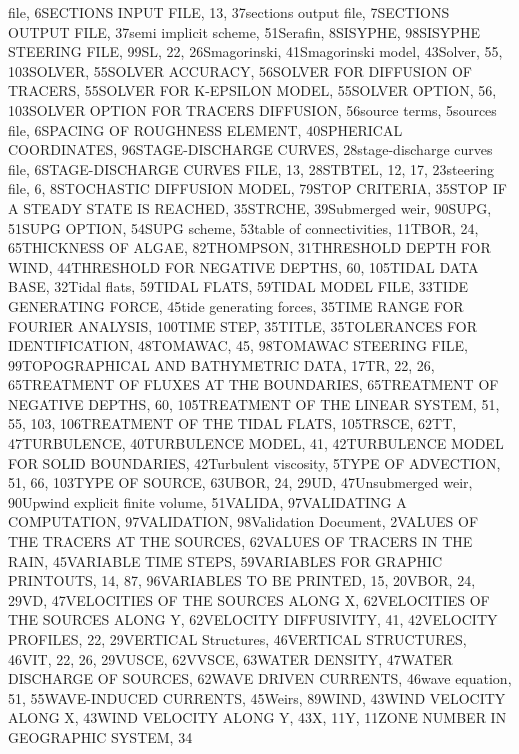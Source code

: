 \documentclass{article} %
\begin{document}
file, 6SECTIONS INPUT FILE, 13, 37sections output file, 7SECTIONS OUTPUT FILE, 37semi implicit scheme, 51Serafin, 8SISYPHE, 98SISYPHE STEERING FILE, 99SL, 22, 26Smagorinski, 41Smagorinski model, 43Solver, 55, 103SOLVER, 55SOLVER ACCURACY, 56SOLVER FOR DIFFUSION OF TRACERS, 55SOLVER FOR K-EPSILON  MODEL, 55SOLVER OPTION, 56, 103SOLVER OPTION FOR TRACERS DIFFUSION, 56source terms, 5sources file, 6SPACING OF ROUGHNESS ELEMENT, 40SPHERICAL COORDINATES, 96STAGE-DISCHARGE CURVES, 28stage-discharge curves file, 6STAGE-DISCHARGE CURVES FILE, 13, 28STBTEL, 12, 17, 23steering file, 6, 8STOCHASTIC DIFFUSION MODEL, 79STOP CRITERIA, 35STOP IF A STEADY STATE IS REACHED, 35STRCHE, 39Submerged weir, 90SUPG, 51SUPG OPTION, 54SUPG scheme, 53table of connectivities, 11TBOR, 24, 65THICKNESS OF ALGAE, 82THOMPSON, 31THRESHOLD DEPTH FOR WIND, 44THRESHOLD FOR NEGATIVE DEPTHS, 60, 105TIDAL DATA BASE, 32Tidal flats, 59TIDAL FLATS, 59TIDAL MODEL FILE, 33TIDE GENERATING FORCE, 45tide generating forces, 35TIME RANGE FOR FOURIER ANALYSIS, 100TIME STEP, 35TITLE, 35TOLERANCES FOR IDENTIFICATION, 48TOMAWAC, 45, 98TOMAWAC STEERING FILE, 99TOPOGRAPHICAL AND BATHYMETRIC DATA, 17TR, 22, 26, 65TREATMENT OF FLUXES AT THE BOUNDARIES, 65TREATMENT OF NEGATIVE DEPTHS, 60, 105TREATMENT OF THE LINEAR SYSTEM, 51, 55, 103, 106TREATMENT OF THE TIDAL FLATS, 105TRSCE, 62TT, 47TURBULENCE, 40TURBULENCE MODEL, 41, 42TURBULENCE MODEL FOR SOLID BOUNDARIES, 42Turbulent viscosity, 5TYPE OF ADVECTION, 51, 66, 103TYPE OF SOURCE, 63UBOR, 24, 29UD, 47Unsubmerged weir, 90Upwind explicit finite volume, 51VALIDA, 97VALIDATING A COMPUTATION, 97VALIDATION, 98Validation Document, 2VALUES OF THE TRACERS AT THE SOURCES, 62VALUES OF TRACERS IN THE RAIN, 45VARIABLE TIME STEPS, 59VARIABLES FOR GRAPHIC PRINTOUTS, 14, 87, 96VARIABLES TO BE PRINTED, 15, 20VBOR, 24, 29VD, 47VELOCITIES OF THE SOURCES ALONG X, 62VELOCITIES OF THE SOURCES ALONG Y, 62VELOCITY DIFFUSIVITY, 41, 42VELOCITY PROFILES, 22, 29VERTICAL Structures, 46VERTICAL STRUCTURES, 46VIT, 22, 26, 29VUSCE, 62VVSCE, 63WATER DENSITY, 47WATER DISCHARGE OF SOURCES, 62WAVE DRIVEN CURRENTS, 46wave equation, 51, 55WAVE-INDUCED CURRENTS, 45Weirs, 89WIND, 43WIND VELOCITY ALONG X, 43WIND VELOCITY ALONG Y, 43X, 11Y, 11ZONE NUMBER IN GEOGRAPHIC SYSTEM, 34
\end{document}
